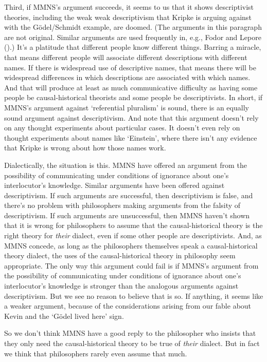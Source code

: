 \documentclass[
  11pt,
  letterpaper,
  DIV=11,
  numbers=noendperiod,
  twoside]{scrartcl}
\begin{document}
Third, if MMNS's argument succeeds, it seems to us that it shows
descriptivist theories, including the weak weak descriptivism that
Kripke is arguing against with the Gödel/Schmidt example, are doomed.
(The arguments in this paragraph are not original. Similar arguments are
used frequently in, e.g., Fodor and Lepore
().) It's a platitude that different
people know different things. Barring a miracle, that means different
people will associate different descriptions with different names. If
there is widespread use of descriptive names, that means there will be
widespread differences in which descriptions are associated with which
names. And that will produce at least as much communicative difficulty
as having some people be causal-historical theorists and some people be
descriptivists. In short, if MMNS's argument against `referential
pluralism' is sound, there is an equally sound argument against
descriptivism. And note that this argument doesn't rely on any thought
experiments about particular cases. It doesn't even rely on thought
experiments about names like `Einstein', where there isn't any evidence
that Kripke is wrong about how those names work.

Dialectically, the situation is this. MMNS have offered an argument from
the possibility of communicating under conditions of ignorance about
one's interlocutor's knowledge. Similar arguments have been offered
against descriptivism. If such arguments are successful, then
descriptivism is false, and there's no problem with philosophers making
arguments from the falsity of descriptivism. If such arguments are
unsuccessful, then MMNS haven't shown that it is wrong for philosophers
to assume that the causal-historical theory is the right theory for
\emph{their} dialect, even if some other people are descriptivists. And,
as MMNS concede, as long as the philosophers themselves speak a
causal-historical theory dialect, the uses of the causal-historical
theory in philosophy seem appropriate. The only way this argument could
fail is if MMNS's argument from the possibility of communicating under
conditions of ignorance about one's interlocutor's knowledge is stronger
than the analogous arguments against descriptivism. But we see no reason
to believe that is so. If anything, it seems like a weaker argument,
because of the considerations arising from our fable about Kevin and the
`Gödel lived here' sign.

So we don't think MMNS have a good reply to the philosopher who insists
that they only need the causal-historical theory to be true of
\emph{their} dialect. But in fact we think that philosophers rarely even
assume that much.
\end{document}
